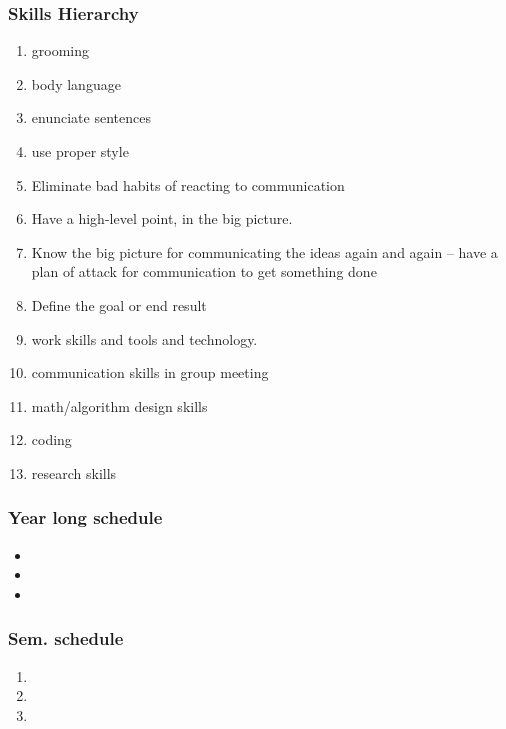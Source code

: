 \begin{frame}
\frametitle{ Skills Hierarchy }
\begin{enumerate} 
\item grooming
\item body language
\item enunciate sentences
\item use proper style 
\item Eliminate bad habits of reacting to communication 
\item Have a high-level point, in the big picture. 
\item Know the big picture for communicating the ideas again and again -- have a plan of attack for communication to get something done
\item Define the goal or end result 
\item work skills and tools and technology. 
\item communication skills in group meeting
\item math/algorithm design skills 
\item coding
\item research skills 
\end{enumerate} 
\end{frame}


\begin{frame}
\frametitle{Year long schedule} 
\begin{itemize}
\item 
\item 
\item 
\end{itemize} 
\end{frame} 

\begin{frame}
\frametitle{Sem. schedule} 
\begin{enumerate}
\item 
\item 
\item 
\end{enumerate} 
\end{frame}



